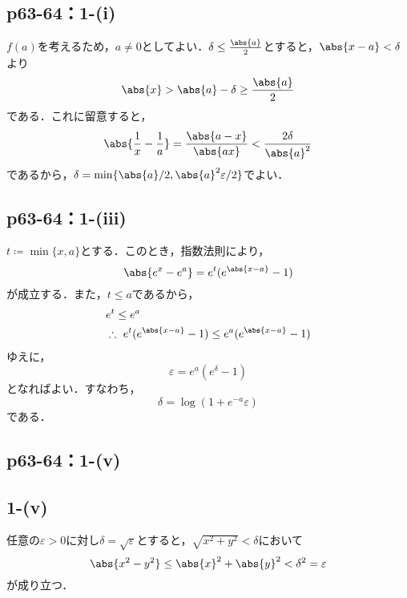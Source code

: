 \documentclass[a4paper,10pt,fleqn]{ltjsarticle}
\begin{document}
    \newpage 


    \subsection*{p63-64：1-(i)}

\begin{tleftbar}
    $f(a)$を考えるため，$a \ne 0$としてよい．$\delta \le \frac{\abs{a}}{2}$とすると，$\abs{x-a}<\delta$より
    \[
       \abs{x} > \abs{a}-\delta \ge \frac{\abs{a}}{2}
    \]
    である．これに留意すると，
    \[
        \abs{\frac{1}{x}-\frac{1}{a}}=\frac{\abs{a-x}}{\abs{ax}} <\frac{2 \delta}{\abs{a}^2}
    \]
    であるから，$\delta = \min \{ \abs{a}/2,\abs{a}^2\varepsilon/2 \}$でよい．
\end{tleftbar}



\subsection*{p63-64：1-(iii)}


\begin{tleftbar}
    $t \coloneqq \min \{x,a\}$とする．このとき，指数法則により，
    \[
        \abs{e^x-e^a}=e^t (e^{\abs{x-a}}-1)
    \]
    が成立する．また，$t \le a$であるから，
    \begin{align*}
       & e^t \le e^a \\
        & \therefore ~ e^t(e^{\abs{x-a}}-1) \le e^a(e^{\abs{x-a}}-1)
    \end{align*}
    ゆえに，
    \[
        \varepsilon = e^a (e^\delta -1)
    \]
    となればよい．すなわち，
    \[
        \delta = \log (1+e^{-a}\varepsilon)
    \]
    である．
\end{tleftbar}


\subsection*{p63-64：1-(v)}



\subsection*{1-(v)}
  \begin{leftbar}
    任意の$\varepsilon > 0$に対し$\delta = \sqrt{\varepsilon}$とすると，$\sqrt{x^2 + y^2} < \delta$において
    \[
      \abs{x^2-y^2} \leq \abs{x}^2 + \abs{y}^2 < \delta^2 = \varepsilon
    \]
    が成り立つ．
  \end{leftbar}
\end{document}
